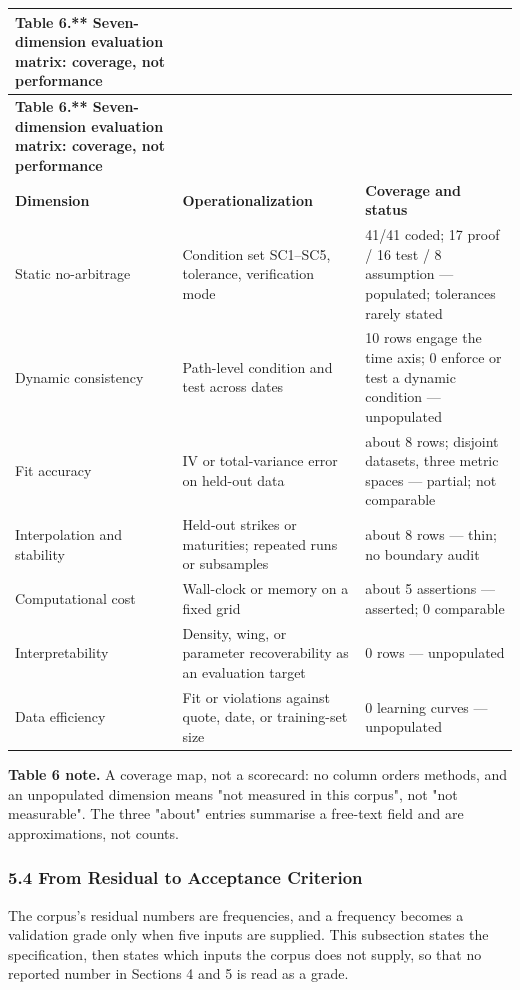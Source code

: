 \documentclass[11pt]{article}
\begin{document}
\begingroup
\begin{longtable}{@{}p{}p{}p{}@{}}
\toprule
\textbf{Table 6.** Seven-dimension evaluation matrix: coverage, not performance} & \textbf{} & \textbf{} \\
\midrule
\endfirsthead
\toprule
\textbf{Table 6.** Seven-dimension evaluation matrix: coverage, not performance} & \textbf{} & \textbf{} \\
\midrule
\endhead
\textbf{Dimension} & \textbf{Operationalization} & \textbf{Coverage and status} \\
Static no-arbitrage & Condition set SC1–SC5, tolerance, verification mode & 41/41 coded; 17 proof / 16 test / 8 assumption — populated; tolerances rarely stated \\
Dynamic consistency & Path-level condition and test across dates & 10 rows engage the time axis; 0 enforce or test a dynamic condition — unpopulated \\
Fit accuracy & IV or total-variance error on held-out data & about 8 rows; disjoint datasets, three metric spaces — partial; not comparable \\
Interpolation and stability & Held-out strikes or maturities; repeated runs or subsamples & about 8 rows — thin; no boundary audit \\
Computational cost & Wall-clock or memory on a fixed grid & about 5 assertions — asserted; 0 comparable \\
Interpretability & Density, wing, or parameter recoverability as an evaluation target & 0 rows — unpopulated \\
Data efficiency & Fit or violations against quote, date, or training-set size & 0 learning curves — unpopulated \\
\bottomrule
\end{longtable}
\endgroup

\textbf{Table 6 note.} A coverage map, not a scorecard: no column orders methods, and an unpopulated dimension means "not measured in this corpus", not "not measurable". The three "about" entries summarise a free-text field and are approximations, not counts.

\subsubsection*{5.4 From Residual to Acceptance Criterion}
The corpus's residual numbers are frequencies, and a frequency becomes a validation grade only when five inputs are supplied. This subsection states the specification, then states which inputs the corpus does not supply, so that no reported number in Sections 4 and 5 is read as a grade.
\end{document}
